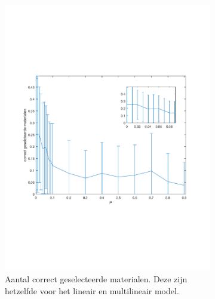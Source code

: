 \documentclass[12pt]{report}
\newcommand{\rulesep}{\unskip\ \vrule height -1ex\ }
\begin{document}
\begin{figure}

\begin{subfigure}[b]{0.5\textwidth}
\includegraphics[width=\textwidth,trim=0 200 0 175 cm]{PMC_AAM_10_100_corr.pdf}
\caption{Aantal correct geselecteerde materialen. Deze zijn hetzelfde voor het lineair en multilineair model. \label{fig:Acorr}}
\end{subfigure} \rulesep
\begin{subfigure}[b]{0.5\textwidth}

\end{subfigure}
\end{figure}
\end{document}
